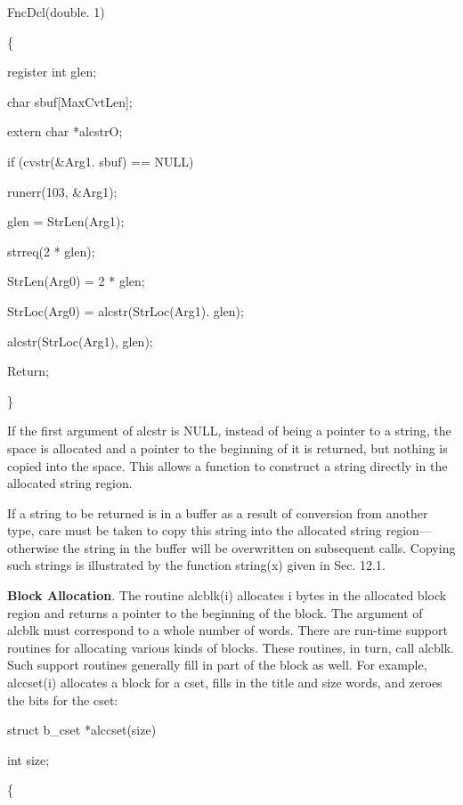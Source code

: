 {\ttfamily\mdseries
FncDcl(double. 1)}

{\ttfamily\mdseries
\{}

{\ttfamily\mdseries
register int glen;}

{\ttfamily\mdseries
char sbuf[MaxCvtLen];}

{\ttfamily\mdseries
extern char *alcstrO;}

{\ttfamily\mdseries
if (cvstr(\&Arg1. sbuf) == NULL)}

{\ttfamily\mdseries
runerr(103, \&Arg1);}

{\ttfamily\mdseries
glen = StrLen(Arg1);}

{\ttfamily\mdseries
strreq(2 * glen);}

{\ttfamily\mdseries
StrLen(Arg0) = 2 * glen;}

{\ttfamily\mdseries
StrLoc(Arg0) = alcstr(StrLoc(Arg1). glen);}

{\ttfamily\mdseries
alcstr(StrLoc(Arg1), glen);}

{\ttfamily\mdseries
Return;}

{\ttfamily\mdseries
\}}


If the first argument of alcstr is NULL, instead of being a pointer to
a string, the space is allocated and a pointer to the beginning of it
is returned, but nothing is copied into the space. This allows a
function to construct a string directly in the allocated string
region.

If a string to be returned is in a buffer as a result of conversion
from another type, care must be taken to copy this string into the
allocated string region---otherwise the string in the buffer will
be overwritten on subsequent calls. Copying such strings is
illustrated by the function string(x) given in Sec. 12.1.

\textbf{Block Allocation}. The routine alcblk(i) allocates i bytes in
the allocated block region and returns a pointer to the beginning of
the block. The argument of alcblk must correspond to a whole number of
words. There are run-time support routines for allocating various
kinds of blocks. These routines, in turn, call alcblk. Such support
routines generally fill in part of the block as well. For example,
alccset(i) allocates a block for a cset, fills in the title and size
words, and zeroes the bits for the cset:

{\ttfamily\mdseries
struct b\_cset *alccset(size)}

{\ttfamily\mdseries
int size;}

{\ttfamily\mdseries
\{}

